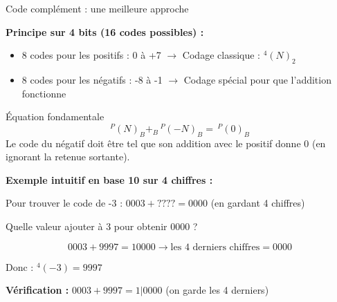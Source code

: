 \documentclass[aspectratio=1610]{beamer}
\begin{document}
\begin{frame}{Code complément : une meilleure approche}

  \textbf{Principe sur 4 bits (16 codes possibles) :}
  \begin{itemize}
    \item 8 codes pour les positifs : 0 à +7 $\rightarrow$ Codage classique : $^4(N)_2$
    \item 8 codes pour les négatifs : -8 à -1 $\rightarrow$ Codage spécial pour que l'addition fonctionne
  \end{itemize}

  \begin{block}{Équation fondamentale}
    \[
      ^P(N)_B +_B \, ^P(-N)_B = \, ^P(0)_B
    \]
    Le code du négatif doit être tel que son addition avec le positif donne 0 (en ignorant la retenue sortante).
  \end{block}

  \vspace{0.5em}

  \textbf{Exemple intuitif en base 10 sur 4 chiffres :}

  Pour trouver le code de -3 : \quad $0003 + ???? = 0000$ (en gardant 4 chiffres)

  Quelle valeur ajouter à 3 pour obtenir 0000 ?

  \[
    0003 + 9997 = 10000 \rightarrow \text{les 4 derniers chiffres} = 0000
  \]

  Donc : $^4(-3) = 9997$

  \vspace{0.3em}

  \textbf{Vérification :} $0003 + 9997 = 1|0000$ (on garde les 4 derniers) 

\end{frame}
\end{document}
